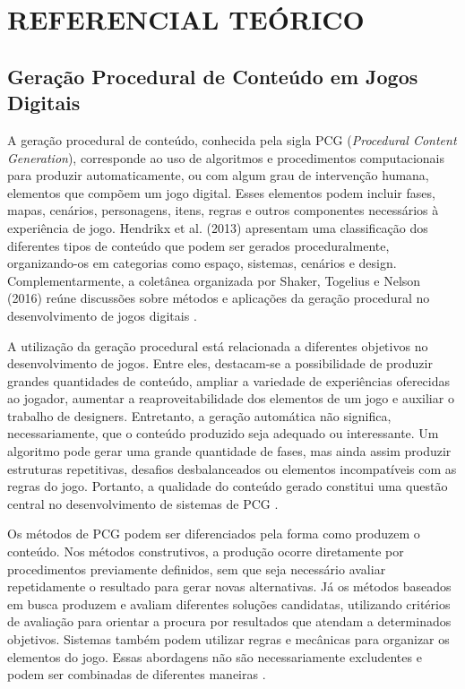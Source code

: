 \chapter{REFERENCIAL TEÓRICO}
\label{cap:referencial}

\section{Geração Procedural de Conteúdo em Jogos Digitais}
\label{sec:pcg}

A geração procedural de conteúdo, conhecida pela sigla PCG
(\textit{Procedural Content Generation}), corresponde ao uso de
algoritmos e procedimentos computacionais para produzir
automaticamente, ou com algum grau de intervenção humana,
elementos que compõem um jogo digital. Esses elementos podem
incluir fases, mapas, cenários, personagens, itens, regras
e outros componentes necessários à experiência de jogo.
Hendrikx et al. (2013) apresentam uma classificação dos
diferentes tipos de conteúdo que podem ser gerados
proceduralmente, organizando-os em categorias como espaço,
sistemas, cenários e design. Complementarmente, a coletânea 
organizada por Shaker, Togelius e Nelson (2016) reúne discussões 
sobre métodos e aplicações da geração procedural no desenvolvimento 
de jogos digitais \cite{Hendrikx2013,Shaker2016,TogeliusSearch2016}.

A utilização da geração procedural está relacionada a
diferentes objetivos no desenvolvimento de jogos. Entre
eles, destacam-se a possibilidade de produzir grandes
quantidades de conteúdo, ampliar a variedade de experiências
oferecidas ao jogador, aumentar a reaproveitabilidade dos
elementos de um jogo e auxiliar o trabalho de designers.
Entretanto, a geração automática não significa,
necessariamente, que o conteúdo produzido seja adequado
ou interessante. Um algoritmo pode gerar uma grande
quantidade de fases, mas ainda assim produzir estruturas
repetitivas, desafios desbalanceados ou elementos
incompatíveis com as regras do jogo. Portanto, a qualidade
do conteúdo gerado constitui uma questão central no
desenvolvimento de sistemas de PCG
\cite{Hendrikx2013,Shaker2016,MalekiZhao2024}.

Os métodos de PCG podem ser diferenciados pela forma
como produzem o conteúdo. Nos métodos construtivos,
a produção ocorre diretamente por procedimentos
previamente definidos, sem que seja necessário avaliar 
repetidamente o resultado para gerar novas alternativas. 
Já os métodos baseados em busca produzem e avaliam diferentes 
soluções candidatas, utilizando critérios de avaliação para 
orientar a procura por resultados que atendam a determinados
objetivos. Sistemas também podem utilizar regras e
mecânicas para organizar os elementos do jogo. Essas
abordagens não são necessariamente excludentes e
podem ser combinadas de diferentes maneiras
\cite{ShakerConstructive2016,TogeliusSearch2016,
Togelius2011,NelsonRules2016}.

